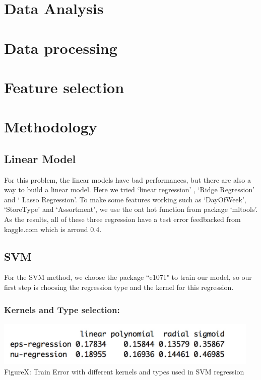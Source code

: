 \documentclass[12pt]{article}
\begin{document}
\section {Data Analysis}

\section {Data processing}

\section {Feature selection}

\section{\textbf{Methodology}}

\subsection{Linear Model}

For this problem, the linear models have bad performances, but there are also a way to build a linear model. Here we tried `linear regression' , `Ridge Regression' and ` Lasso Regression'. To make some features working such as `DayOfWeek', `StoreType' and `Assortment', we use the ont hot function from package `mltools'. As the results,  all of these three regression have a test error feedbacked from kaggle.com which is arroud 0.4. 

\subsection{\textbf{SVM}}

	For the SVM method, we choose the package ``e1071" to train our model, so our first step is choosing the regression type and the kernel for this regression. 

	\subsubsection{Kernels and Type selection:}

	\begin{center}
	\includegraphics[width=5in]{svmkernal.png}\\
	FigureX: Train Error with different kernels and types used in SVM regression
	\end{center}
\end{document}
